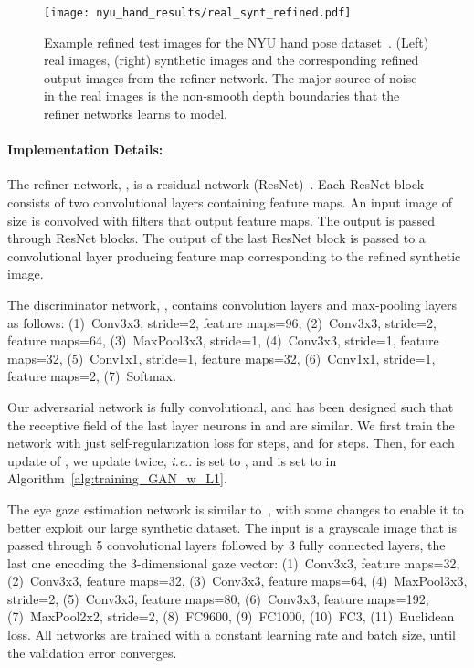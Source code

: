 \documentclass[10pt,twocolumn,letterpaper]{article}
\makeatletter
\DeclareRobustCommand\onedot{\futurelet\@let@token\@onedot}
\def\@onedot{\ifx\@let@token.\else.\null\fi\xspace}
\def\ie{\emph{i.e}\onedot} \def\Ie{\emph{I.e}\onedot}
\makeatother
\begin{document}
\begin{figure*}[t]
\centering
\texttt{[image: nyu\_hand\_results/real\_synt\_refined.pdf]} 
\caption{Example refined test images for the NYU hand pose dataset~\cite{tompson14NYU}. 
(Left) real images, (right) synthetic images and the corresponding refined output images from the refiner network. 
The major source of noise in the real images is the non-smooth depth boundaries that the refiner networks learns to model. 
}
\vspace{-0.2cm}
\label{fig:results_qualitative_hand}
\end{figure*}


\paragraph{Implementation Details:} 
The refiner network, , is a residual network (ResNet)~\cite{He2015}. 
Each ResNet block consists of two convolutional layers containing  feature maps. 
An input image of size  is convolved with   filters that output  feature maps. 
The output is passed through  ResNet blocks. The output of the last ResNet block is passed to a  convolutional layer producing  feature map corresponding to the refined synthetic image.

The discriminator network, , contains  convolution layers and  max-pooling layers as follows: 
(1)~Conv3x3, stride=2, feature maps=96, 
(2)~Conv3x3, stride=2, feature maps=64, 
(3)~MaxPool3x3, stride=1, 
(4)~Conv3x3, stride=1, feature maps=32,  
(5)~Conv1x1, stride=1, feature maps=32,  
(6)~Conv1x1, stride=1, feature maps=2,  
(7)~Softmax. 

Our adversarial network is fully convolutional, and has been designed such that the receptive field of the last layer neurons in  and  are similar.
We first train the  network with just self-regularization loss for  steps, and  for  steps. 
Then, for each update of , we update  twice, \ie  is set to , and  is set to  in Algorithm~\ref{alg:training_GAN_w_L1}.

The eye gaze estimation network is similar to~\cite{Zhang15a}, with some changes to enable it to better exploit our large synthetic dataset.
The input is a  grayscale image that is passed through 5 convolutional layers followed by 3 fully connected layers,  the last one encoding the 3-dimensional gaze vector:
(1)~Conv3x3, feature maps=32, 
(2)~Conv3x3, feature maps=32, 
(3)~Conv3x3, feature maps=64, 
(4)~MaxPool3x3, stride=2, 
(5)~Conv3x3, feature maps=80,  
(6)~Conv3x3, feature maps=192,  
(7)~MaxPool2x2, stride=2,  
(8)~FC9600,  
(9)~FC1000, 
(10)~FC3, 
(11)~Euclidean loss.
All networks are trained with a constant  learning rate and  batch size, until the validation error converges.
\end{document}
